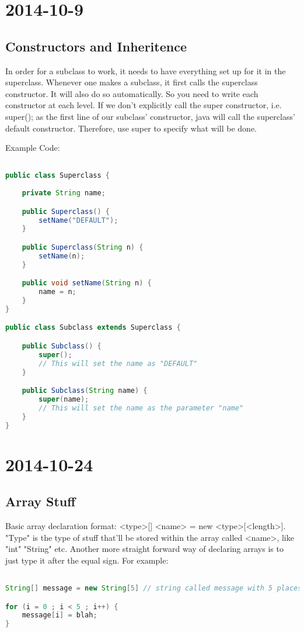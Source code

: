 \documentclass [12 pt, twoside] {article}
\begin{document}
\section{2014-10-9}
\subsection{Constructors and Inheritence}


In order for a subclass to work, it needs to have everything set up
for it in the superclass. Whenever one makes a subclass, it first
calls the superclass constructor. It will also do so automatically.
So you need to write each constructor at each level. If we don't
explicitly call the super constructor, i.e. super(); as the first
line of our subclass' constructor, java will call the superclass'
default constructor. Therefore, use super to specify what will be done.


Example Code:
\begin{lstlisting}[language=java]

public class Superclass {
	
	private String name;

	public Superclass() {
		setName("DEFAULT");
	}

	public Superclass(String n) {
		setName(n);
	}

	public void setName(String n) {
		name = n;
	}
}

public class Subclass extends Superclass {

	public Subclass() {
		super();
		// This will set the name as "DEFAULT"
	}

	public Subclass(String name) {
		super(name);
		// This will set the name as the parameter "name"
	}
}
\end{lstlisting}


\section{2014-10-24}


\subsection{Array Stuff}


Basic array declaration format: <type>[] <name> = new <type>[<length>].
"Type" is the type of stuff that'll be stored within the array called <name>, like
"int" "String" etc.
Another more straight forward way of declaring arrays is to just type it after the equal sign.
For example:
\begin{lstlisting}[language=java]

String[] message = new String[5] // string called message with 5 places

for (i = 0 ; i < 5 ; i++) {
	message[i] = blah;
}
\end{lstlisting}
\end{document}
